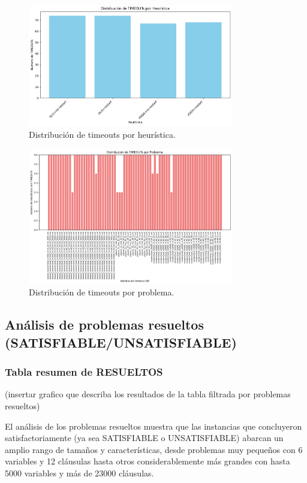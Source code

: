 \begin{figure}[ht]
    \centering
    \includegraphics[width=0.8\textwidth]{Graphics/timeouts_x_heuristica.png}
    \caption{Distribuci\'on de timeouts por heur\'istica.}
    \label{fig:timeouts-x-heuristica}
\end{figure}

\begin{figure}[ht]
    \centering
    \includegraphics[width=0.8\textwidth]{Graphics/timeouts_x_problema.png}
    \caption{Distribuci\'on de timeouts por problema.}
    \label{fig:timeouts-x-problema}
\end{figure}

\subsection{An\'alisis de problemas resueltos (SATISFIABLE/UNSATISFIABLE)}

\subsubsection{Tabla resumen de RESUELTOS}
(insertar grafico que describa los resultados de la tabla filtrada por problemas resueltos)

El análisis de los problemas resueltos muestra que las instancias que concluyeron satisfactoriamente (ya sea SATISFIABLE o UNSATISFIABLE) abarcan un amplio rango de tamaños y características, desde problemas muy pequeños con 6 variables y 12 cláusulas hasta otros considerablemente más grandes con hasta 5000 variables y más de 23000 cláusulas.

